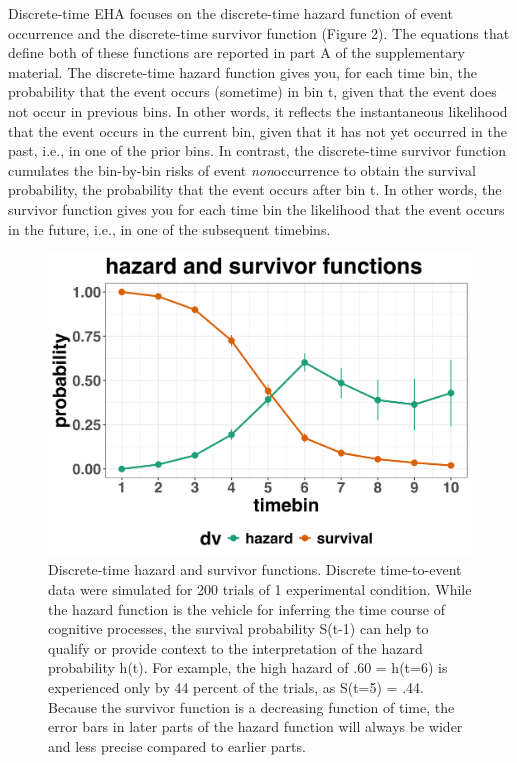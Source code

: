 \documentclass[
  man, donotrepeattitle,floatsintext]{apa6}
\begin{document}
Discrete-time EHA focuses on the discrete-time hazard function of event occurrence and the discrete-time survivor function (Figure 2). The equations that define both of these functions are reported in part A of the supplementary material. The discrete-time hazard function gives you, for each time bin, the probability that the event occurs (sometime) in bin t, given that the event does not occur in previous bins. In other words, it reflects the instantaneous likelihood that the event occurs in the current bin, given that it has not yet occurred in the past, i.e., in one of the prior bins. In contrast, the discrete-time survivor function cumulates the bin-by-bin risks of event \emph{non}occurrence to obtain the survival probability, the probability that the event occurs after bin t. In other words, the survivor function gives you for each time bin the likelihood that the event occurs in the future, i.e., in one of the subsequent timebins.




\begin{figure}[H]

{\centering \includegraphics[width=0.8\linewidth,height=0.67\textheight,]{../sims/figures/haz_surv_single} 

}

\caption{Discrete-time hazard and survivor functions. Discrete time-to-event data were simulated for 200 trials of 1 experimental condition. While the hazard function is the vehicle for inferring the time course of cognitive processes, the survival probability S(t-1) can help to qualify or provide context to the interpretation of the hazard probability h(t). For example, the high hazard of .60 = h(t=6) is experienced only by 44 percent of the trials, as S(t=5) = .44.
Because the survivor function is a decreasing function of time, the error bars in later parts of the hazard function will always be wider and less precise compared to earlier parts.}\label{fig:plot2}
\end{figure}
\end{document}
